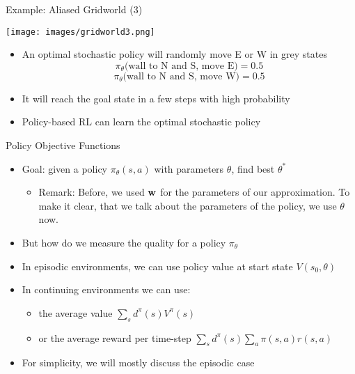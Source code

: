 \documentclass[aspectratio=169]{../latex_main/tntbeamer}  %
\begin{document}
\begin{frame}[c]{Example: Aliased Gridworld (3)}
	
	\begin{center}
		\texttt{[image: images/gridworld3.png]}
	\end{center}
	
	\begin{itemize}
		\item An optimal \alert{stochastic} policy will randomly move E or W in grey states
		$$\pi_\theta\text{(wall to N and S, move E)} = 0.5 $$
		$$\pi_\theta\text{(wall to N and S, move W)} = 0.5 $$
		\item It will reach the goal state in a few steps with high probability
		\item Policy-based RL can learn the optimal stochastic policy
	\end{itemize}
	
\end{frame}
\begin{frame}[c]{Policy Objective Functions}
	
	\begin{itemize}
		\item Goal: given a policy $\pi_\theta(s,a)$ with parameters $\theta$, find best $\theta^*$
		\begin{itemize}
		    \item \alert{Remark}: Before, we used $\mathbf{w}$ for the parameters of our approximation. To make it clear, that we talk about the parameters of the policy, we use $\theta$ now.
		\end{itemize}
		\item But how do we measure the quality for a policy $\pi_\theta$
		\item In episodic environments, we can use policy value at start state $V(s_0, \theta)$
		\item In continuing environments we can use:
		\begin{itemize}
		    \item the average value $\sum_{s} d^{\pi}(s) V^{\pi}(s)$
		    \item or the average reward per time-step $\sum_{s} d^{\pi}(s) \sum_{a} \pi(s,a)r(s,a)$
		\end{itemize}
		\item For simplicity, we will mostly discuss the episodic case
	\end{itemize}
	
\end{frame}
\end{document}
